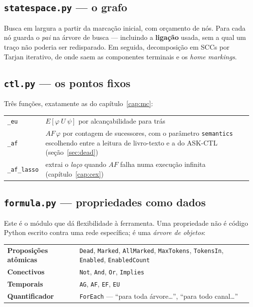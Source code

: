 \documentclass[11pt,a4paper]{report}
\newcommand{\code}[1]{\texttt{\small #1}}
\begin{document}
\subsection{\code{statespace.py} --- o grafo}

Busca em largura a partir da marcação inicial, com orçamento de nós. Para cada
nó guarda o \emph{pai} na árvore de busca --- incluindo a \textbf{ligação}
usada, sem a qual um traço não poderia ser redisparado. Em seguida, decomposição
em SCCs por Tarjan iterativo, de onde saem as componentes terminais e os
\emph{home markings}.

\subsection{\code{ctl.py} --- os pontos fixos}

Três funções, exatamente as do capítulo~\ref{cap:mc}:

\begin{center}
\begin{tabular}{@{}lp{9.4cm}@{}}
\toprule
\code{\_eu} & $E[\varphi\ U\ \psi]$ por alcançabilidade para trás \\
\code{\_af} & $AF\,\varphi$ por contagem de sucessores, com o parâmetro
              \code{semantics} escolhendo entre a leitura de livro-texto e a do
              ASK-CTL (seção~\ref{sec:dead}) \\
\code{\_af\_lasso} & extrai o \emph{laço} quando $AF$ falha numa execução
              infinita (capítulo~\ref{cap:cex}) \\
\bottomrule
\end{tabular}
\end{center}

\subsection{\code{formula.py} --- propriedades como dados}

Este é o módulo que dá flexibilidade à ferramenta. Uma propriedade não é código
Python escrito contra uma rede específica; é uma \emph{árvore de objetos}:

\begin{center}
\begin{tabular}{@{}lp{9.2cm}@{}}
\toprule
\textbf{Proposições atômicas} & \code{Dead}, \code{Marked}, \code{AllMarked}, \code{MaxTokens}, \code{TokensIn}, \code{Enabled}, \code{EnabledCount} \\
\textbf{Conectivos} & \code{Not}, \code{And}, \code{Or}, \code{Implies} \\
\textbf{Temporais} & \code{AG}, \code{AF}, \code{EF}, \code{EU} \\
\textbf{Quantificador} & \code{ForEach} --- ``para toda árvore\ldots'', ``para todo canal\ldots'' \\
\bottomrule
\end{tabular}
\end{center}
\end{document}
